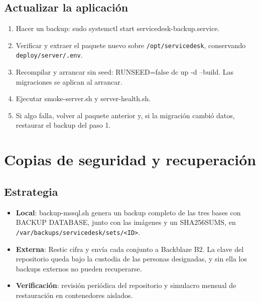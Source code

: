 \documentclass[11pt,a4paper,oneside]{report}
\newcommand{\codus}{\textunderscore\allowbreak}
\DeclareRobustCommand{\cod}[1]{{\small\ttfamily\let\_\codus #1}}
\DeclareRobustCommand{\ruta}[1]{{\small\nolinkurl{#1}}}
\begin{document}
\section{Actualizar la aplicación}
\begin{enumerate}
  \item Hacer un backup: \cod{sudo systemctl start servicedesk-backup.service}.
  \item Verificar y extraer el paquete nuevo sobre \ruta{/opt/servicedesk}, conservando \ruta{deploy/server/.env}.
  \item Recompilar y arrancar sin seed: \cod{RUN\_SEED=false dc up -d --build}. Las migraciones se aplican al arrancar.
  \item Ejecutar \cod{smoke-server.sh} y \cod{server-health.sh}.
  \item Si algo falla, volver al paquete anterior y, si la migración cambió datos, restaurar el backup del paso 1.
\end{enumerate}

\chapter{Copias de seguridad y recuperación}\label{cap:backups}

\section{Estrategia}
\begin{itemize}
  \item \textbf{Local}: \cod{backup-mssql.sh} genera un backup completo de las tres bases con \cod{BACKUP DATABASE}, junto con las imágenes y un \cod{SHA256SUMS}, en \ruta{/var/backups/servicedesk/sets/<ID>}.
  \item \textbf{Externa}: Restic cifra y envía cada conjunto a Backblaze B2. La clave del repositorio queda bajo la custodia de las personas designadas, y sin ella los backups externos no pueden recuperarse.
  \item \textbf{Verificación}: revisión periódica del repositorio y simulacro mensual de restauración en contenedores aislados.
\end{itemize}
\end{document}
